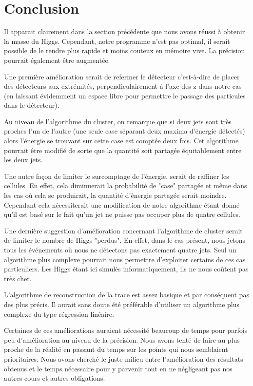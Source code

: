 \documentclass[11pt]{article}
\begin{document}
\newpage
\newpage
\section{Conclusion}
 Il apparait clairement dans la section pr\'ec\'edente que nous avons r\'eussi \`a obtenir la masse du Higgs.
Cependant, notre programme n'est pas optimal, il serait possible de le rendre plus rapide et 
moins couteux en m\'emoire vive. La pr\'ecision pourrait \'egalement être augment\'ee. 

Une première amélioration serait de refermer le d\'etecteur c'est-à-dire de placer des d\'etecteurs aux extrémités, 
perpendiculairement à l'axe des z dans notre cas (en laissant évidemment un
espace libre pour permettre le passage des 
particules dans le d\'etecteur). 

Au niveau de l'algorithme du cluster, on remarque que si deux jets sont très proches l'un de l'autre (une seule case 
s\'eparant deux maxima d'énergie détectés) alors l'énergie se trouvant sur cette
case est comptée deux fois. Cet algorithme
 pourrait être modifié de sorte que la quantité soit partagée équitablement
entre les deux jets.

Une autre façon de limiter le surcomptage de l'énergie, serait de raffiner les 
cellules. En effet, cela diminuerait la probabilité de "case" partagée et même dans les cas où cela se produirait, la
quantité d'énergie partagée serait moindre. Cependant cela nécessiterait une modification de notre 
algorithme 
étant donné qu'il est basé sur le fait qu'un jet ne puisse pas occuper
plus de quatre cellules.

Une dernière suggestion d'amélioration concernant l'algorithme de cluster serait
de limiter le nombre
de Higgs "perdus". En effet, dans le cas présent, nous jetons tous les
événements où nous ne détectons pas exactement quatre jets. Seul un algorithme
plus complexe pourrait nous permettre d'exploiter certains de ces cas
particuliers. Les Higgs étant ici simulés informatiquement, ils ne nous coûtent
pas très cher.

L'algorithme de reconstruction de la trace est assez basique et par conséquent
pas des plus précis. Il aurait sans doute
été préférable d'utiliser un algorithme plus complexe du type régression linéaire.


Certaines de ces améliorations auraient nécessité beaucoup de temps 
pour parfois peu d'amélioration au niveau de la précision. Nous avons tenté de
faire au plus proche de la réalité en passant du temps sur les points qui nous
semblaient prioritaires. Nous avons cherché le juste milieu entre l'amélioration
des résultats obtenus et le temps nécessaire pour y parvenir tout en ne
négligeant
pas nos autres cours et autres obligations.


		
\end{document}
